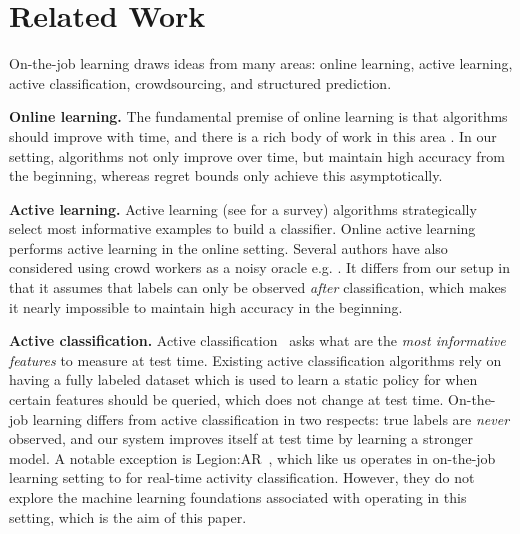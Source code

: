 \section{Related Work}
\label{sec:related}


On-the-job learning draws ideas from many areas:
online learning, active learning, active classification, crowdsourcing, and structured
prediction.


\textbf{Online learning.}
The fundamental premise of online learning is that algorithms should improve
with time, and there is a rich body of work in this area \citep{cesabianchi06prediction}.
In our setting, algorithms not only improve over time, but maintain high accuracy from the beginning,
whereas regret bounds only achieve this asymptotically.

\textbf{Active learning.}
Active learning (see \citet{settles2010active} for a survey) algorithms
strategically select most informative examples to build a classifier.
Online active learning
\citep{helmbold1997some,sculley2007online,chu2011unbiased}
performs active learning in the online setting.
Several authors have also considered using crowd workers as a noisy oracle
e.g. \citep{donmez2008proactive,golovin2010near}. %
It differs from our setup in that 
it assumes that labels can only be observed {\em after} classification,
which makes it nearly impossible to maintain high accuracy in the beginning.


\textbf{Active classification.}
Active classification~\citet{greiner2002learning,chai2004test,esmeir2007anytime}
asks what are the {\em most informative features} to measure at test time.
Existing active classification algorithms rely on having a fully labeled
dataset which is used to learn a static policy for when certain features should
be queried, which does not change at test time.
On-the-job learning differs from active classification in two respects: true
labels are {\em never} observed, and our system improves itself at test
time by learning a stronger model.
A notable exception is Legion:AR~\citet{lasecki2013realtime},
which like us operates in on-the-job learning setting
to for real-time activity classification.
However, they do not explore the machine learning foundations associated
with operating in this setting, which is the aim of this paper.

